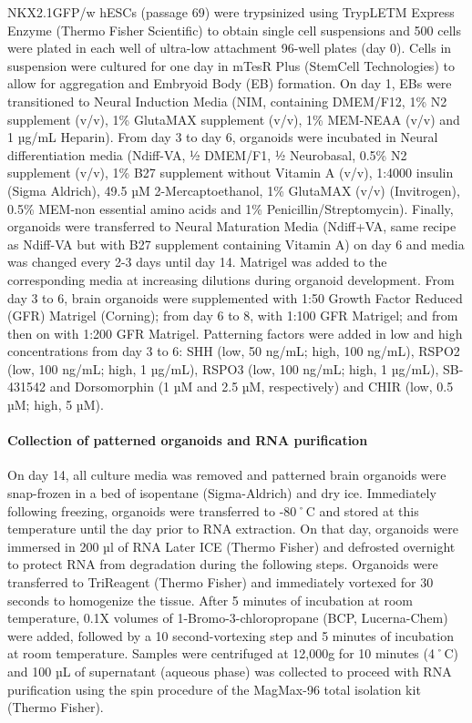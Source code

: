 NKX2.1GFP/w hESCs (passage 69) were trypsinized using TrypLETM Express Enzyme (Thermo Fisher Scientific) to obtain single cell suspensions and 500 cells were plated in each well of ultra-low attachment 96-well plates (day 0). Cells in suspension were cultured for one day in mTesR Plus (StemCell Technologies) to allow for aggregation and Embryoid Body (EB) formation. On day 1, EBs were transitioned to Neural Induction Media (NIM, containing DMEM/F12, 1\% N2 supplement (v/v), 1\% GlutaMAX supplement (v/v), 1\% MEM-NEAA (v/v) and 1 µg/mL Heparin). From day 3 to day 6, organoids were incubated in Neural differentiation media (Ndiff-VA, ½ DMEM/F1, ½ Neurobasal, 0.5\% N2 supplement (v/v), 1\% B27 supplement without Vitamin A (v/v), 1:4000 insulin (Sigma Aldrich), 49.5 µM 2-Mercaptoethanol, 1\% GlutaMAX (v/v) (Invitrogen), 0.5\% MEM-non essential amino acids and 1\% Penicillin/Streptomycin). Finally, organoids were transferred to Neural Maturation Media (Ndiff+VA, same recipe as Ndiff-VA but with B27 supplement containing Vitamin A) on day 6 and media was changed every 2-3 days until day 14. Matrigel was added to the corresponding media at increasing dilutions during organoid development. From day 3 to 6, brain organoids were supplemented with 1:50 Growth Factor Reduced (GFR) Matrigel (Corning); from day 6 to 8, with 1:100 GFR Matrigel; and from then on with 1:200 GFR Matrigel. Patterning factors were added in low and high concentrations from day 3 to 6: SHH (low, 50 ng/mL; high, 100 ng/mL), RSPO2 (low, 100 ng/mL; high, 1 µg/mL), RSPO3 (low, 100 ng/mL; high, 1 µg/mL), SB-431542 and Dorsomorphin (1 µM and 2.5 µM, respectively) and CHIR (low, 0.5 µM; high, 5 µM).  

\paragraph{Collection of patterned organoids and RNA purification}
On day 14, all culture media was removed and patterned brain organoids were snap-frozen in a bed of isopentane (Sigma-Aldrich) and dry ice. Immediately following freezing, organoids were transferred to -80˚C and stored at this temperature until the day prior to RNA extraction. On that day, organoids were immersed in 200 µl of RNA Later ICE (Thermo Fisher) and defrosted overnight to protect RNA from degradation during the following steps. Organoids were transferred to TriReagent  (Thermo Fisher) and immediately vortexed for 30 seconds to homogenize the tissue. After 5 minutes of incubation at room temperature, 0.1X volumes of 1-Bromo-3-chloropropane (BCP, Lucerna-Chem) were added, followed by a 10 second-vortexing step and 5 minutes of incubation at room temperature. Samples were centrifuged at 12,000g for 10 minutes (4˚C) and 100 µL of supernatant (aqueous phase) was collected to proceed with RNA purification using the spin procedure of the MagMax-96 total isolation kit (Thermo Fisher). 

